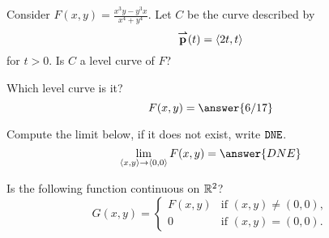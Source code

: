 \documentclass{ximera}
\author{Jim Talamo \and Bart Snapp}
\begin{document}
\begin{exercise}
  Consider $F(x,y) = \frac{x^3 y - y^3 x}{x^4+y^4}$. Let $C$ be the
  curve described by
  \[
  {\overset{\boldsymbol{\rightharpoonup}}{\mathbf{p}}}(t) = \left\langle 2t,t\right\rangle
  \]
  for $t> 0$. Is $C$ a level curve of $F$?
  \begin{multipleChoice}
  \end{multipleChoice}
  \begin{exercise}
    Which level curve is it?
    \[
    F(x,y) = \answer{6/17}
    \]
  \end{exercise}
  \begin{exercise}
    Compute the limit below, if it does not exist, write $\verb|DNE|$.
    \[
    \lim_{\vector{x,y}\to \vector{0,0}} F(x,y) = \answer{DNE}
    \]
  \end{exercise}
  \begin{exercise}
    Is the following function continuous on $\mathbb R^2$?
    \[
    G(x,y) =
    \begin{cases}
      F(x,y) &\text{if $(x,y)\ne (0,0)$},\\
      0 &\text{if $(x,y) = (0,0)$}.
    \end{cases}
    \]
    \begin{multipleChoice}
    \end{multipleChoice}
  \end{exercise}
\end{exercise}
\end{document}
